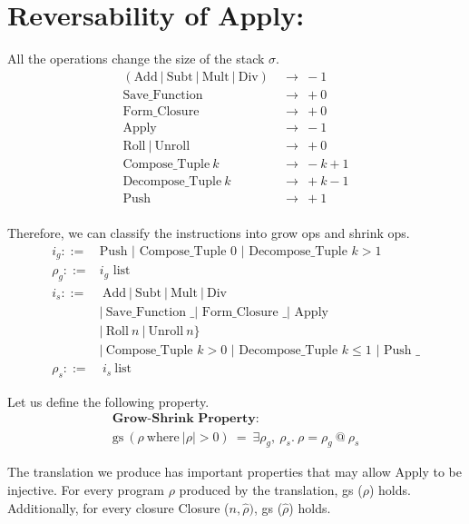 \documentclass[11pt]{article}
\begin{document}
\section*{Reversability of Apply:}

All the operations change the size of the stack $\sigma$.
\begin{align*}
        (\text{Add}\ |\ \text{Subt}\ |\ \text{Mult}\ |\ \text{Div})\ &\rightarrow\ -1\\
        \text {Save\_Function} &\rightarrow\ +0\\
        \text {Form\_Closure} &\rightarrow\ +0\\
        \text {Apply}\ &\rightarrow\ -1\\
        \text{Roll}\  |\ \text{Unroll} \ &\rightarrow\ +0\\
        \text {Compose\_Tuple}\ k\ &\rightarrow\ -k + 1\\
        \text {Decompose\_Tuple}\ k\ &\rightarrow\ +k - 1\\
        \text {Push}\ &\rightarrow\ +1\\
\end{align*}

Therefore, we can classify the instructions into grow ops and shrink ops.
\begin{align*}
    i_g ::=& \text{Push | Compose\_Tuple 0 | Decompose\_Tuple $k > 1$}\\
    \rho_g ::=& \text{$i_g$ list}\\
    i_s ::=&\ \text {Add}\ |\ \text {Subt}\ |\ \text {Mult}\ |\ \text {Div}\\
    & |\ \text{Save\_Function \_ | Form\_Closure \_ | Apply}\\
    & |\ \text{Roll}\ n\ |\ \text {Unroll}\ n\}\\
    & |\ \text{Compose\_Tuple $k>0$ | Decompose\_Tuple $k \le 1$ | Push \_}\\
    \rho_s ::=&\ i_s\ \text{list}
\end{align*}

Let us define the following property.
\begin{align*}
        \textbf{Grow-Shrink Property}:\\
            \text{gs}\ (\rho\ \text{where}\ |\rho| > 0)\ = \ \exists \rho_g,\ \rho_s.\ \rho = \rho_g\ @\ \rho_s
\end{align*}
    
        The translation we produce has important properties that may allow Apply to be injective. For every program $\rho$ produced by the translation, gs ($\rho$) holds. Additionally, for every closure Closure ($n, \hat{\rho})$, gs ($\hat{\rho}$) holds. 
\end{document}
